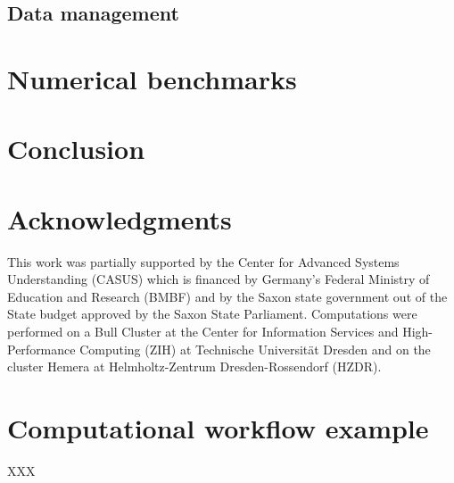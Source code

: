 \documentclass[preprint,12pt, compress]{elsarticle}
\begin{document}
\subsection{Data management}
\label{ss.data.management}





\section{Numerical benchmarks}
\label{s.benchmarks}






\section{Conclusion}
\label{s.conclusion}




\section*{Acknowledgments}

This work was partially supported by the Center for Advanced Systems Understanding (CASUS) which is financed by Germany's Federal Ministry of Education and Research (BMBF) and by the Saxon state government out of the State budget approved by the Saxon State Parliament. Computations were performed on a Bull Cluster at the Center for Information Services and High-Performance Computing (ZIH) at Technische Universit\"at Dresden and on the cluster Hemera at Helmholtz-Zentrum Dresden-Rossendorf (HZDR).

\appendix

\section{Computational workflow example}
\label{s.workflow}




\vspace{1cm}
XXX









\end{document}
